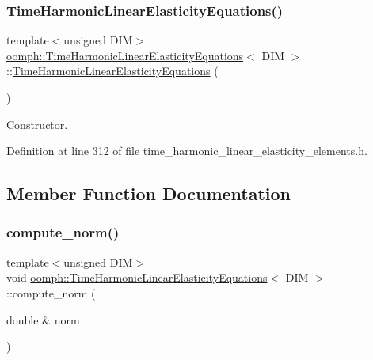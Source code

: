 \subsubsection{\texorpdfstring{Time\+Harmonic\+Linear\+Elasticity\+Equations()}{TimeHarmonicLinearElasticityEquations()}}
{\footnotesize\ttfamily template$<$unsigned D\+IM$>$ \\
\hyperlink{classoomph_1_1TimeHarmonicLinearElasticityEquations}{oomph\+::\+Time\+Harmonic\+Linear\+Elasticity\+Equations}$<$ D\+IM $>$\+::\hyperlink{classoomph_1_1TimeHarmonicLinearElasticityEquations}{Time\+Harmonic\+Linear\+Elasticity\+Equations} (\begin{DoxyParamCaption}{ }\end{DoxyParamCaption})\hspace{0.3cm}{\ttfamily [inline]}}



Constructor. 



Definition at line 312 of file time\+\_\+harmonic\+\_\+linear\+\_\+elasticity\+\_\+elements.\+h.



\subsection{Member Function Documentation}
\mbox{\label{classoomph_1_1TimeHarmonicLinearElasticityEquations_a50a5236dcb29a7547a7e2fd75bf96b7f}} 
\subsubsection{\texorpdfstring{compute\+\_\+norm()}{compute\_norm()}}
{\footnotesize\ttfamily template$<$unsigned D\+IM$>$ \\
void \hyperlink{classoomph_1_1TimeHarmonicLinearElasticityEquations}{oomph\+::\+Time\+Harmonic\+Linear\+Elasticity\+Equations}$<$ D\+IM $>$\+::compute\+\_\+norm (\begin{DoxyParamCaption}\item[{double \&}]{norm }\end{DoxyParamCaption})\hspace{0.3cm}{\ttfamily [virtual]}}



